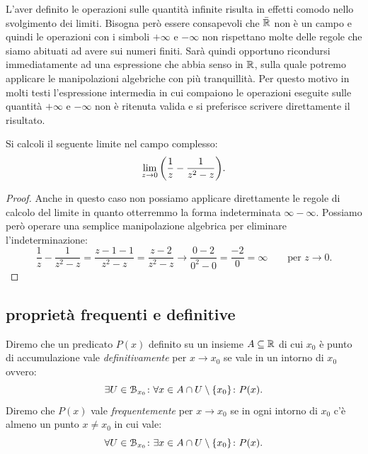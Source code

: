 L'aver definito le operazioni sulle quantità infinite
risulta in effetti comodo nello svolgimento dei limiti.
Bisogna però essere consapevoli che $\bar {{\mathbb R}}$ non è un campo
e quindi le operazioni con i simboli $+\infty$ e $-\infty$
non rispettano molte delle regole che siamo abituati
ad avere sui numeri finiti.
Sarà quindi opportuno ricondursi immediatamente ad una espressione
che abbia senso in ${\mathbb R}$, sulla quale potremo
applicare le manipolazioni algebriche con più tranquillità.
Per questo motivo in molti testi l'espressione intermedia in cui compaiono 
le operazioni eseguite sulle quantità $+\infty$ e $-\infty$ non è ritenuta valida
e si preferisce scrivere direttamente il risultato.
  
\begin{example}
Si calcoli il seguente limite nel campo complesso:
\[
\lim_{z\to 0} {\left( \frac 1 {z} - \frac 1 {z^2-z} \right)}. 
\]
\end{example}
\begin{proof}
  Anche in questo caso non possiamo applicare direttamente le regole 
  di calcolo del limite in quanto otterremmo la forma indeterminata 
  $\infty - \infty$.
  Possiamo però operare una semplice manipolazione algebrica
  per eliminare l'indeterminazione:
  \[
    \frac 1 {z} - \frac 1 {z^2-z}
    = \frac{z- 1 - 1}{z^2-z}
    = \frac{z-2}{z^2-z}
    \to \frac{0-2}{0^2-0} = \frac{-2}{0} = \infty 
    \qquad \text{per $z\to 0.$}
  \]
\end{proof}

\subsection{proprietà frequenti e definitive}

\begin{definition}
Diremo che un predicato $P(x)$ definito su un insieme $A\subseteq {\mathbb R}$ 
di cui $x_0$ è punto di accumulazione vale 
\emph{definitivamente}%
%
 per $x\to x_0$ se
vale in un intorno di $x_0$ ovvero:
\[
  \exists U\in \mathcal B_{x_0}\colon \forall x \in A\cap U\setminus{\left\{ x_0 \right\}}\colon P(x).
\]
Diremo che $P(x)$ vale \emph{frequentemente}%
%
 per $x\to x_0$
se in ogni intorno di $x_0$ c'è almeno un punto $x\neq x_0$ 
in cui vale:
\[
  \forall U\in \mathcal B_{x_0}\colon \exists x\in A\cap U\setminus{\left\{ x_0 \right\}}
  \colon P(x).
\]
\end{definition}

